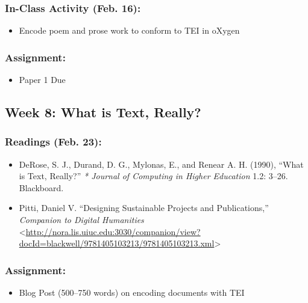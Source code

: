 \documentclass[]{article}
\begin{document}
\subsubsection{In-Class Activity (Feb.
16):}\label{in-class-activity-feb.-16-1}

\begin{itemize}
\itemsep1pt\parskip0pt
\item
  Encode poem and prose work to conform to TEI in oXygen
\end{itemize}

\subsubsection{Assignment:}\label{assignment}

\begin{itemize}
\itemsep1pt\parskip0pt
\item
  Paper 1 Due
\end{itemize}

\subsection{Week 8: What is Text,
Really?}\label{week-8-what-is-text-really}

\subsubsection{Readings (Feb. 23):}\label{readings-feb.-23}

\begin{itemize}
\itemsep1pt\parskip0pt
\item
  DeRose, S. J., Durand, D. G., Mylonas, E., and Renear A. H. (1990),
  ``What is Text, Really?'' \emph{* Journal of Computing in Higher
  Education} 1.2: 3--26. Blackboard.
\item
  Pitti, Daniel V. ``Designing Sustainable Projects and Publications,''
  \emph{Companion to Digital Humanities}
  \textless{}\url{http://nora.lis.uiuc.edu:3030/companion/view?docId=blackwell/9781405103213/9781405103213.xml}\textgreater{}
\end{itemize}

\subsubsection{Assignment:}\label{assignment-1}

\begin{itemize}
\itemsep1pt\parskip0pt
\item
  Blog Post (500--750 words) on encoding documents with TEI
\end{itemize}
\end{document}
